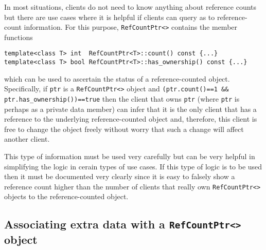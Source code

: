 In most situations, clients do not need to know anything about
reference counts but there are use cases where it is helpful if
clients can query as to reference-count information.  For this
purpose, {}\texttt{RefCountPtr<>} contains the member functions
%
{\scriptsize\begin{verbatim}
template<class T> int  RefCountPtr<T>::count() const {...}
template<class T> bool RefCountPtr<T>::has_ownership() const {...}
\end{verbatim}}
%
{}\noindent{}which can be used to ascertain the status of a
reference-counted object.  Specifically, if {}\texttt{ptr} is a
{}\texttt{RefCountPtr<>} object and {}\texttt{(ptr.count()==1 \&\&
ptr.has\_ownership())==true} then the client that owns {}\texttt{ptr}
(where {}\texttt{ptr} is perhaps as a private data member) can infer
that it is the only client that has a reference to the underlying
reference-counted object and, therefore, this client is free to change
the object freely without worry that such a change will affect another
client.

This type of information must be used very carefully but can be very
helpful in simplifying the logic in cerain types of use cases. If this
type of logic is to be used then it must be documented very clearly
since it is easy to falsely show a reference count higher than the
number of clients that really own {}\texttt{RefCountPtr<>} objects to
the reference-counted object.

%
\subsection{Associating extra data with a {}\texttt{RefCountPtr<>} object}
\label{rcp:sec:extra-data}
%

